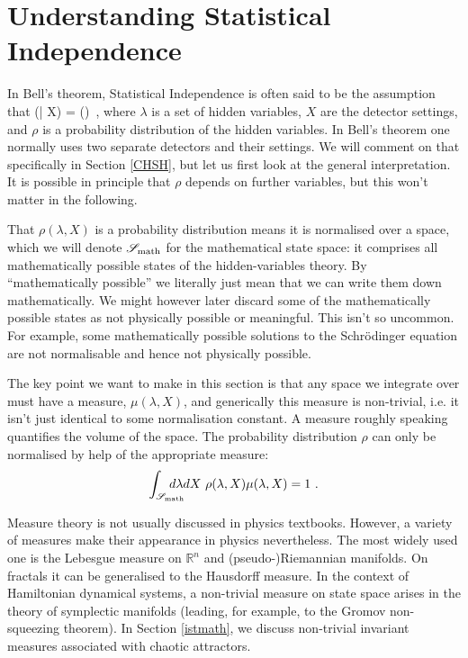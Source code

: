 \documentclass{article}
\makeatletter
\newcommand\be{\@ifstar{\[}{\begin{equation}}}
\newcommand\ee{\@ifstar{\]}{\end{equation}}}
\makeatother
\begin{document}
\section{Understanding Statistical Independence}
\label{general} 

In Bell's theorem, Statistical Independence
is often said to be the assumption that
\be
\label{SI2}
\rho (\lambda | X) = \rho(\lambda)~,
\ee
where $\lambda$ is a set of hidden variables, $X$ are the detector settings, and $\rho$ is a probability distribution of the hidden variables. In Bell's theorem one normally uses two separate detectors and their settings. We will comment on that specifically in Section \ref{CHSH}, but let us first look at the general interpretation. It is possible in principle that $\rho$ depends on further variables, but this won't matter in the following.

That $\rho(\lambda,X)$ is a probability distribution means it is normalised over a space, which we will denote ${\mathscr S}_{\rm math}$ for the mathematical state space: it comprises all mathematically possible states of the hidden-variables theory. By ``mathematically possible'' we literally just mean that we can write them down mathematically. We might however later discard some of the mathematically possible states as not physically possible or meaningful. This isn't so uncommon. For example, some mathematically possible solutions to the Schr\"odinger equation are not normalisable and hence not physically possible. 

The key point we want to make in this section is that any space we integrate over must have a measure, $\mu(\lambda,X)$, and generically this measure is non-trivial, i.e. it isn't just identical to some normalisation constant. A measure roughly speaking quantifies the volume of the space. The probability distribution $\rho$ can only be normalised by help of the appropriate measure:
\begin{equation}
\int_{{\mathscr S}_{\rm math}} \hspace*{-0.5cm} d\lambda dX~ \rho(\lambda, X) \mu(\lambda,X) = 1~.
\end{equation}

Measure theory \cite{MeasureTheory} is not usually discussed in physics textbooks. However, a variety of measures make their appearance in physics nevertheless. The most widely used one is the Lebesgue measure on ${\mathbb R}^n$ and (pseudo-)Riemannian manifolds. On fractals it can be generalised to the Hausdorff measure. In the context of Hamiltonian dynamical systems, a non-trivial measure on state space arises in the theory of symplectic manifolds (leading, for example, to the Gromov non-squeezing theorem). In Section \ref{istmath}, we discuss non-trivial invariant measures associated with chaotic attractors. 
\end{document}
